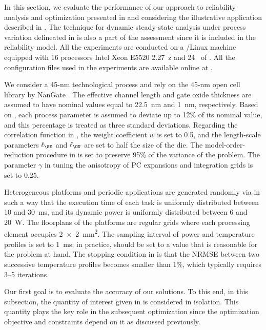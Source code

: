 In this section, we evaluate the performance of our approach to reliability
analysis and optimization presented in  and
 considering the illustrative application
described in . The technique for dynamic
steady-state analysis under process variation delineated in
 is also a part of the assessment
since it is included in the reliability model. All the experiments are conducted
on a /Linux machine equipped with 16 processors Intel Xeon E5520
2.27~z and 24~ of . All the configuration files used in
the experiments are available online at \cite{eslab2015}.

We consider a 45-nm technological process and rely on the 45-nm open cell
library by NanGate \cite{nangate}. The effective channel length and gate oxide
thickness are assumed to have nominal values equal to 22.5~nm and 1~nm,
respectively. Based on  \cite{itrs}, each process parameter is assumed
to deviate up to 12\% of its nominal value, and this percentage is treated as
three standard deviations. Regarding the correlation function in
, the weight coefficient $w$ is set to 0.5, and the
length-scale parameters $\ell_\SE$ and $\ell_\OU$ are set to half the size of
the die. The model-order-reduction procedure in
 is set to preserve 95\% of the variance of the
problem. The parameter $\gamma$ in  tuning the
anisotropy of \ac{PC} expansions and integration grids is set to 0.25.

Heterogeneous platforms and periodic applications are generated randomly via
 \cite{dick1998} in such a way that the execution time of each task is
uniformly distributed between 10 and 30~ms, and its dynamic power is uniformly
distributed between 6 and 20~W. The floorplans of the platforms are regular
grids where each processing element occupies 2~×~2~mm\textsuperscript{2}. The
sampling interval \dt of power and temperature profiles is set to 1~ms; in
practice, \dt should be set to a value that is reasonable for the problem at
hand. The stopping condition in  is
that the \ac{NRMSE} between two successive temperature profiles becomes smaller
than 1\%, which typically requires 3--5 iterations.


Our first goal is to evaluate the accuracy of our solutions. To this end, in
this subsection, the quantity of interest given in
 is considered in isolation. This quantity
plays the key role in the subsequent optimization since the optimization
objective and constraints depend on it as discussed previously.

